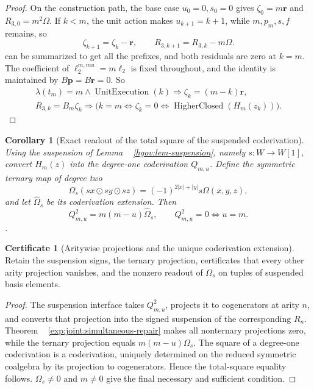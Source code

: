\documentclass[12pt,a4paper,openany,notitlepage]{report}
\theoremstyle{plain}
\newtheorem{corollary}[theorem]{Corollary}
\theoremstyle{definition}
\newtheorem*{certificate}{Certificate}
\theoremstyle{remark}
\def\mathcal#1{#1}\def\mathsf#1{#1}\def\mathbb#1{#1}%
\begin{document}
\begin{CJK*}
\begin{proof}
On the construction path, the base case $u_0=0,s_0=0$ gives $\zeta_0=m\mathbf r$ and $\mathcal R_{3,0}=m^2\Omega$. If $k<m$, the unit action makes $u_{k+1}=k+1$, while $m,p_m,s,f$ remains, so \[
 \zeta_{k+1}=\zeta_k-\mathbf r,\qquad
 \mathcal R_{3,k+1}=\mathcal R_{3,k}-m\Omega.
\] can be summarized to get all the prefixes, and both residuals are zero at $k=m$. The coefficient of $\ell_2^{m,mu}=m\ell_2$ is fixed throughout, and the identity is maintained by $B\mathbf p=B\mathbf r=0$. So \[
 \begin{gathered}
 \lambda(t_m)=m\land\operatorname{UnitExecution}(k)
 \Rightarrow \zeta_k=(m-k)\mathbf r,\\
 \mathcal R_{3,k}=\mathcal B_m\zeta_k
 \Rightarrow
 \bigl(k=m\Longleftrightarrow\zeta_k=0
 \Longleftrightarrow\operatorname{HigherClosed}(H_m(z_k))\bigr).
 \end{gathered}
\]\end{proof}


\begin{corollary} [Exact readout of the total square of the suspended coderivation]
\label{exp:joint:coderivation-square}
Using the suspension of Lemma ~ \ref{hgov:lem-suspension}, namely $s:W\to W[1]$, convert $H_m(z)$ into the degree-one coderivation $Q_{m,u}$. Define the symmetric ternary map of degree two
\[
 \Omega_s(sx\odot sy\odot sz)
 =(-1)^{2|x|+|y|}s\Omega(x,y,z),
\]
and let $\widehat\Omega_s$ be its coderivation extension. Then
\[
 Q_{m,u}^{2}=m(m-u)\widehat\Omega_s,
 \qquad Q_{m,u}^{2}=0\Longleftrightarrow u=m.
\].
\end{corollary}
\begin{certificate} [Aritywise projections and the unique coderivation extension]
Retain the suspension signs, the ternary projection, certificates that every other arity projection vanishes, and the nonzero readout of $\Omega_s$ on tuples of suspended basis elements.
\end{certificate}
\begin{proof}
The suspension interface takes $Q_{m,u}^2$, projects it to cogenerators at arity $n$, and converts that projection into the signed suspension of the corresponding $\mathcal R_n$. Theorem ~ \ref{exp:joint:simultaneous-repair} makes all nonternary projections zero, while the ternary projection equals $m(m-u)\Omega_s$. The square of a degree-one coderivation is a coderivation, uniquely determined on the reduced symmetric coalgebra by its projection to cogenerators. Hence the total-square equality follows. $\Omega_s\ne0$ and $m\ne0$ give the final necessary and sufficient condition.
\end{proof}


\end{CJK*}
\end{document}
